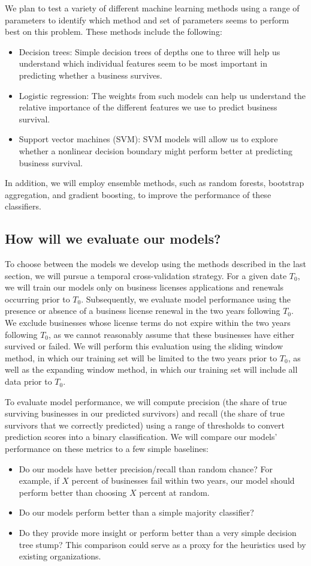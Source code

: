 We plan to test a variety of different machine learning methods using a range of parameters to identify which method and set of parameters seems to perform best on this problem. These methods include the following:
\begin{itemize}
\item Decision trees: Simple decision trees of depths one to three will help us understand which individual features seem to be most important in predicting whether a business survives. 
\item Logistic regression: The weights from such models can help us understand the relative importance of the different features we use to predict business survival.
\item Support vector machines (SVM): SVM models will allow us to explore whether a nonlinear decision boundary might perform better at predicting business survival.
\end{itemize}
In addition, we will employ ensemble methods, such as random forests, bootstrap aggregation, and gradient boosting, to improve the performance of these classifiers. 

\subsection{How will we evaluate our models?}
To choose between the models we develop using the methods described in the last section, we will pursue a temporal cross-validation strategy. For a given date $T_0$, we will train our models only on business licenses applications and renewals occurring prior to $T_0$. Subsequently, we evaluate model performance using the presence or absence of a business license renewal in the two years following $T_0$. We exclude businesses whose license terms do not expire within the two years following $T_0$, as we cannot reasonably assume that these businesses have either survived or failed. We will perform this evaluation using the sliding window method, in which our training set will be limited to the two years prior to $T_0$, as well as the expanding window method, in which our training set will include all data prior to $T_0$.

To evaluate model performance, we will compute precision (the share of true surviving businesses in our predicted survivors) and recall (the share of true survivors that we correctly predicted) using a range of thresholds to convert prediction scores into a binary classification. We will compare our models' performance on these metrics to a few simple baselines:
\begin{itemize}
\item Do our models have better precision/recall than random chance? For example, if $X$ percent of businesses fail within two years, our model should perform better than choosing $X$ percent at random. 
\item Do our models perform better than a simple majority classifier? 
\item Do they provide more insight or perform better than a very simple decision tree stump? This comparison could serve as a proxy for the heuristics used by existing organizations. 
\end{itemize}


